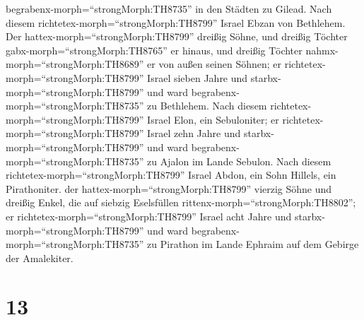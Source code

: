 begrabenx-morph=``strongMorph:TH8735'' in den Städten zu Gilead.
 Nach diesem richtetex-morph=``strongMorph:TH8799'' Israel
Ebzan von Bethlehem.  Der
hattex-morph=``strongMorph:TH8799'' dreißig Söhne, und dreißig Töchter
gabx-morph=``strongMorph:TH8765'' er hinaus, und dreißig Töchter
nahmx-morph=``strongMorph:TH8689'' er von außen seinen Söhnen; er
richtetex-morph=``strongMorph:TH8799'' Israel sieben Jahre 
und starbx-morph=``strongMorph:TH8799'' und ward
begrabenx-morph=``strongMorph:TH8735'' zu Bethlehem.  Nach
diesem richtetex-morph=``strongMorph:TH8799'' Israel Elon, ein
Sebuloniter; er richtetex-morph=``strongMorph:TH8799'' Israel zehn Jahre
 und starbx-morph=``strongMorph:TH8799'' und ward
begrabenx-morph=``strongMorph:TH8735'' zu Ajalon im Lande Sebulon.
 Nach diesem richtetex-morph=``strongMorph:TH8799'' Israel
Abdon, ein Sohn Hillels, ein Pirathoniter.  der
hattex-morph=``strongMorph:TH8799'' vierzig Söhne und dreißig Enkel, die
auf siebzig Eselsfüllen rittenx-morph=``strongMorph:TH8802''; er
richtetex-morph=``strongMorph:TH8799'' Israel acht Jahre 
und starbx-morph=``strongMorph:TH8799'' und ward
begrabenx-morph=``strongMorph:TH8735'' zu Pirathon im Lande Ephraim auf
dem Gebirge der Amalekiter.

\hypertarget{section-12}{%
\section{13}\label{section-12}}

